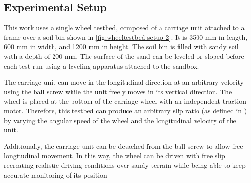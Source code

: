 \subsection{Experimental Setup} \label{subsec:experimental-setup}


This work uses a single wheel testbed, composed of a carriage unit attached to
a frame over a soil bin shown in \cref{fig:wheeltestbed-setup-2}. It is 3500 mm
in length, 600 mm in width, and 1200 mm in height. The soil bin is filled with
sandy soil with a depth of 200 mm. The surface of the sand can be leveled or
sloped before each test run using a leveling apparatus attached to the sandbox.

The carriage unit can move in the longitudinal direction at an arbitrary
velocity using the ball screw while the unit freely moves in its vertical
direction. The wheel is placed at the bottom of the carriage wheel with an
independent traction motor. Therefore, this testbed can produce an arbitrary
slip ratio (as defined in \cite{Slip2009}) by varying the angular speed of the
wheel and the longitudinal velocity of the unit. 

Additionally, the carriage unit can be detached from the ball screw to allow
free longitudinal movement. In this way, the wheel can be driven with free slip
recreating realistic driving conditions over sandy terrain while being able to
keep accurate monitoring of its position.

